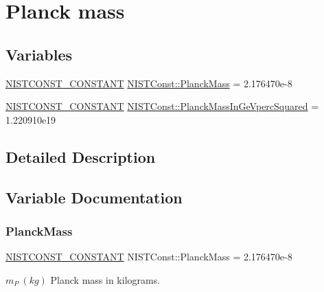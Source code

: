 \hypertarget{group___n_i_s_t_const-_planck_mass}{}\section{Planck mass}
\label{group___n_i_s_t_const-_planck_mass}
\subsection*{Variables}
\begin{DoxyCompactItemize}
\item 
\mbox{\hyperlink{group___n_i_s_t_const-_macros_ga2b0fc1d7452373f816175dd86ce26729}{N\+I\+S\+T\+C\+O\+N\+S\+T\+\_\+\+C\+O\+N\+S\+T\+A\+NT}} \mbox{\hyperlink{group___n_i_s_t_const-_planck_mass_gaa7617a5b3ffb40b1ab6b80ae4017fe47}{N\+I\+S\+T\+Const\+::\+Planck\+Mass}} = 2.\+176470e-\/8
\item 
\mbox{\hyperlink{group___n_i_s_t_const-_macros_ga2b0fc1d7452373f816175dd86ce26729}{N\+I\+S\+T\+C\+O\+N\+S\+T\+\_\+\+C\+O\+N\+S\+T\+A\+NT}} \mbox{\hyperlink{group___n_i_s_t_const-_planck_mass_ga8d336f9833239f0cce753a1912e0a6df}{N\+I\+S\+T\+Const\+::\+Planck\+Mass\+In\+Ge\+Vperc\+Squared}} = 1.\+220910e19
\end{DoxyCompactItemize}


\subsection{Detailed Description}


\subsection{Variable Documentation}
\mbox{\label{group___n_i_s_t_const-_planck_mass_gaa7617a5b3ffb40b1ab6b80ae4017fe47}} 
\subsubsection{\texorpdfstring{Planck\+Mass}{PlanckMass}}
{\footnotesize\ttfamily \mbox{\hyperlink{group___n_i_s_t_const-_macros_ga2b0fc1d7452373f816175dd86ce26729}{N\+I\+S\+T\+C\+O\+N\+S\+T\+\_\+\+C\+O\+N\+S\+T\+A\+NT}} N\+I\+S\+T\+Const\+::\+Planck\+Mass = 2.\+176470e-\/8}

$m_P \ (kg)$ Planck mass in kilograms. \mbox{\label{group___n_i_s_t_const-_planck_mass_ga8d336f9833239f0cce753a1912e0a6df}} 

